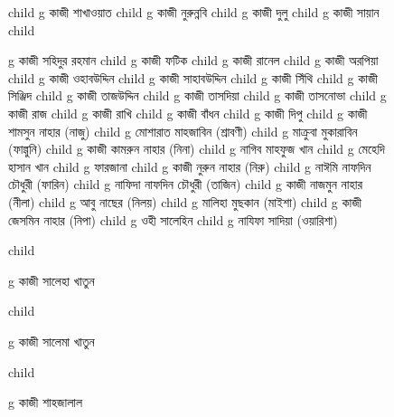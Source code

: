 \documentclass{article}
\begin{document}
\begin{figure}
{\begin{genealogypicture}
{{{{{        }%
        child{
          g{ কাজী শাখাওয়াত  }
              child{   g{ কাজী নুরুন্নবি}  }
              child{
                g{ কাজী দুলু } child{  g{ কাজী সায়ান  } }
              }
        }%
        child{
          g{ কাজী সহিদুর রহমান}
 child{    g{ কাজী ফটিক } 
            child{    g{ কাজী রানেল }   } %
            child{    g{ কাজী অরপিয়া }   }
      }
  child{    g{ কাজী ওহাবউদ্দিন  }   }
 child{    g{ কাজী সাহাবউদ্দিন   } 
 child{    g{ কাজী সিঁথি }   }
  child{    g{ কাজী সিঞ্জিদ }   }
      }
  child{    g{ কাজী তাজউদ্দিন  } 
  child{ g{ কাজী তাসদিয়া }  }
 child{    g{ কাজী তাসনোভা }   }
  }
  child{    g{ কাজী রাজ } 
 child{    g{ কাজী রাখি  }   } %
 child{    g{ কাজী বাঁধন }   }
  }
  child{    g{ কাজী দিপু }   }
  child{    g{ কাজী শামসুন নাহার (নাজু)  } 
        child{ g{ মোশারাত মাহজাবিন (শ্রাবণী) }  }
        child{ g{ মাক্রুবা মুকারাবিন (ফাল্গুনি) }  }
  }
  child{    g{ কাজী কামরুন নাহার (নিনা) } 
      child{ g{  নাগিব মাহফুজ খান  }  }
      child{ g{  মেহেদি হাসান খান }  }
      child{ g{  ফারজানা }  }
    }
  child{    g{ কাজী নুরুন নাহার (নিরু) }  
          child{ g{ নাঈমি নাফদিন চৌধুরী (ফারিন) }  }
          child{ g{ নাফিদা নাফদিন চৌধুরী (তাজিন) }  }
   }
  child{    g{ কাজী নাজমুন নাহার (নীলা) }
        child{ g{ আবু নাছের (নিলয়) }  }
        child{ g{  মালিহা মুছকান (মাইশা)}  }
     }
  child{    g{ কাজী জেসমিন নাহার (নিপা)  } 
        child{ g{ ওহী সালেহিন  }  }
        child{ g{ নাযিফা সাদিয়া (ওয়ারিশা) }  }
    }
 

        }%
        child{
          g{ কাজী সালেহা খাতুন }

        }%
        child{
          g{ কাজী সালেমা খাতুন }

        }%
        child{
          g{ কাজী শাহজালাল }

}}}}}
\end{genealogypicture}}
\end{figure}
\end{document}
